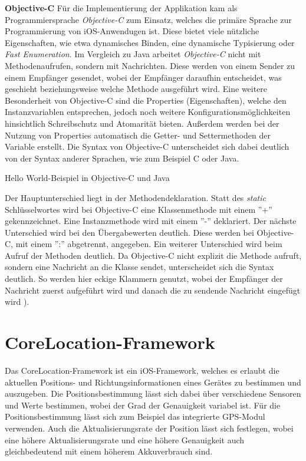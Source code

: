 \textbf{Objective-C}
Für die Implementierung der Applikation kam als Programmiersprache \emph{Objective-C} zum Einsatz, welches die primäre Sprache zur Programmierung von iOS-Anwendugen ist. 
Diese bietet viele nützliche Eigenschaften, wie etwa dynamisches Binden, eine dynamische Typisierung oder \emph{Fast Enumeration}.
Im Vergleich zu Java arbeitet \emph{Objective-C} nicht mit Methodenaufrufen, sondern mit Nachrichten. Diese werden von einem Sender zu einem Empfänger gesendet, wobei der Empfänger daraufhin entscheidet, was geschieht beziehungsweise welche Methode ausgeführt wird. Eine weitere Besonderheit von Objective-C sind die Properties (Eigenschaften), welche den Instanzvariablen entsprechen, jedoch noch weitere Konfigurationsmöglichkeiten hinsichtlich Schreibschutz und Atomarität bieten. Außerdem werden bei der Nutzung von Properties automatisch die Getter- und Settermethoden der Variable erstellt.
Die Syntax von Objective-C unterscheidet sich dabei deutlich von der Syntax anderer Sprachen, wie zum Beispiel C oder Java.

\begin{listing}[htb!]
    \caption{Hello World-Beispiel in Objective-C und Java}
	\label{lst:helloworld_objc}
\end{listing}

Der Hauptunterschied liegt in der Methodendeklaration. Statt des \emph{static} Schlüsselwortes wird bei Objective-C eine Klassenmethode mit einem ''+'' gekennzeichnet. Eine Instanzmethode wird mit einem ''-'' deklariert. Der nächste Unterschied wird bei den Übergabewerten deutlich. Diese werden bei Objective-C, mit einem '':'' abgetrennt, angegeben.
Ein weiterer Unterschied wird beim Aufruf der Methoden deutlich. Da Objective-C nicht explizit die Methode aufruft, sondern eine Nachricht an die Klasse sendet, unterscheidet sich die Syntax deutlich. So werden hier eckige Klammern genutzt, wobei der Empfänger der Nachricht zuerst aufgeführt wird und danach die zu sendende Nachricht eingefügt wird \cite{objc}).


\section{CoreLocation-Framework}
\label{sec:technologies:corelocation}
Das CoreLocation-Framework ist ein iOS-Framework, welches es erlaubt die aktuellen Positions- und Richtungsinformationen eines Gerätes zu bestimmen und auszugeben.
Die Positionsbestimmung lässt sich dabei über verschiedene Sensoren und Werte bestimmen, wobei der Grad der Genauigkeit variabel ist.
Für die Positionsbestimmung lässt sich zum Beispiel das integrierte GPS-Modul verwenden.
Auch die Aktualisierungsrate der Position lässt sich festlegen, wobei eine höhere Aktualisierungsrate und eine höhere Genauigkeit auch gleichbedeutend mit einem höherem Akkuverbrauch sind.
	
